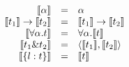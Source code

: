 
\[
\begin{array}{rcl}
  \llbracket \alpha \rrbracket                 & = & \alpha \\
  \llbracket t_1 \rrbracket \to \llbracket t_2 \rrbracket  & = & \llbracket t_1 \rrbracket \to \llbracket t_2 \rrbracket \\
  \llbracket \forall \alpha. t \rrbracket    & = & \forall \alpha. \llbracket t \rrbracket \\
  \llbracket t_1 \& t_2 \rrbracket           & = & \langle \llbracket t_1 \rrbracket, \llbracket t_2 \rrbracket \rangle \\
  \llbracket \{ l : t \} \rrbracket          & = & \llbracket t \rrbracket
\end{array}
\]